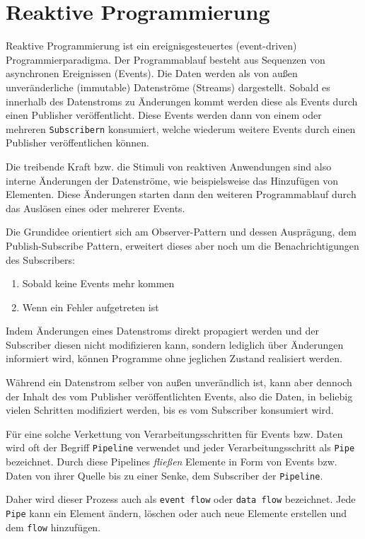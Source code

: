 \section{Reaktive Programmierung}
\label{section:reaktive_programmierung}
Reaktive Programmierung ist ein ereignisgesteuertes (event-driven) Programmierparadigma.
Der Programmablauf besteht aus Sequenzen von asynchronen Ereignissen (Events).
Die Daten werden als von außen unveränderliche (immutable) Datenströme (Streams) dargestellt.
Sobald es innerhalb des Datenstroms zu Änderungen kommt werden diese als Events durch einen Publisher veröffentlicht.
Diese Events werden dann von einem oder mehreren \verb|Subscribern| konsumiert, welche wiederum weitere Events durch einen
Publisher veröffentlichen können.

Die treibende Kraft bzw. die Stimuli von reaktiven Anwendungen sind also interne Änderungen der Datenströme, wie beispielsweise das
Hinzufügen von Elementen.
Diese Änderungen starten dann den weiteren Programmablauf durch das Auslösen eines oder mehrerer Events.

Die Grundidee orientiert sich am Observer-Pattern und dessen Ausprägung, dem Publish-Subscribe Pattern, erweitert dieses aber
noch um die Benachrichtigungen des Subscribers:
\begin{enumerate}
  \item Sobald keine Events mehr kommen
  \item Wenn ein Fehler aufgetreten ist
\end{enumerate}
Indem Änderungen eines Datenstroms direkt propagiert werden und der Subscriber diesen nicht modifizieren kann, sondern lediglich über Änderungen informiert wird,
können Programme ohne jeglichen Zustand realisiert werden\parencite{Escoffier2017}.

Während ein Datenstrom selber von außen unverändlich ist, kann aber dennoch der Inhalt
des vom Publisher veröffentlichten Events, also die Daten, in beliebig vielen Schritten modifiziert werden, bis es vom
Subscriber konsumiert wird.

Für eine solche Verkettung von Verarbeitungsschritten für Events bzw. Daten
wird oft der Begriff \verb|Pipeline| verwendet und jeder Verarbeitungsschritt als \verb|Pipe| bezeichnet.
Durch diese Pipelines \textit{fließen} Elemente in Form von Events bzw. Daten von ihrer Quelle
bis zu einer Senke, dem Subscriber der \verb|Pipeline|.

Daher wird dieser Prozess auch als \verb|event flow| oder \verb|data flow| bezeichnet.
Jede \verb|Pipe| kann ein Element ändern, löschen oder auch neue Elemente erstellen und dem \verb|flow| hinzufügen.


